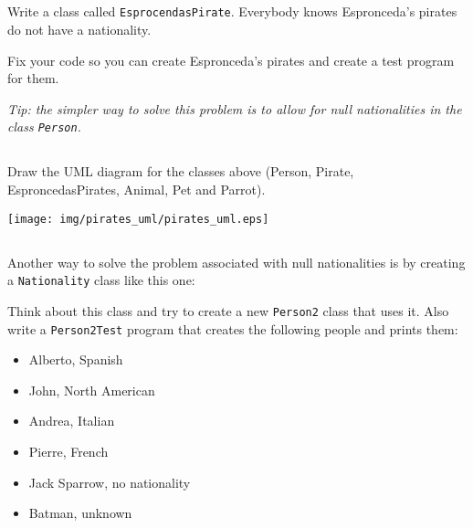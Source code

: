 \documentclass[a4paper, 11pt]{article}
\begin{document}
\subsection{}

Write a class called \verb+EsprocendasPirate+. Everybody knows Espronceda's
pirates do not have a nationality.

Fix your code so you can create Espronceda's pirates and create a test program
for them.


\textsl{Tip: the simpler way to solve this problem is to allow for null
nationalities in the class \texttt{Person}.}









\subsection{}

Draw the UML diagram for the classes above (Person, Pirate, EsproncedasPirates,
Animal, Pet and Parrot).

\begin{solution}
  \centering
    \texttt{[image: img/pirates\_uml/pirates\_uml.eps]}
\end{solution}








\subsection{}

Another way to solve the problem associated with null nationalities is by
creating a \verb+Nationality+ class like this one:


Think about this class and try to create a new \verb+Person2+ class that uses
it. Also write a \verb+Person2Test+ program that creates the following people
and prints them:

\begin{itemize}

  \item Alberto, Spanish

  \item John, North American

  \item Andrea, Italian

  \item Pierre, French

  \item Jack Sparrow, no nationality

  \item Batman, unknown

\end{itemize}
\end{document}
